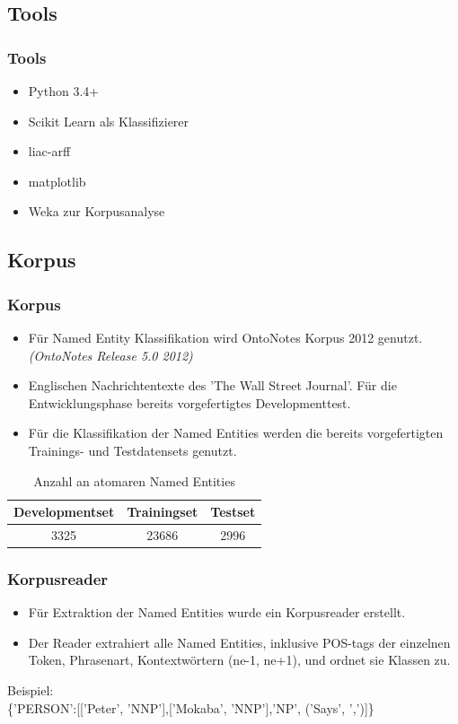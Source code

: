 \documentclass{beamer}
\begin{document}
	\subsection{Tools}
	\begin{frame}
			\frametitle{Tools}
			\begin{itemize}
				\item Python 3.4+
				\item Scikit Learn als Klassifizierer
				\item liac-arff
				\item matplotlib
				\item Weka zur Korpusanalyse
			\end{itemize}
	\end{frame}
	\subsection{Korpus}
	\begin{frame}
			\frametitle{Korpus}
			\begin{itemize}
				\item Für Named Entity Klassifikation wird OntoNotes Korpus 2012 genutzt. \textit{(OntoNotes Release 5.0 2012)}
				\item Englischen Nachrichtentexte des 'The Wall Street Journal'.
				Für die Entwicklungsphase bereits vorgefertigtes Developmenttest.
				\item Für die Klassifikation der Named Entities werden die bereits vorgefertigten Trainings- und Testdatensets genutzt.
			\end{itemize}
			 \begin{table}
			 	\caption{Anzahl an atomaren Named Entities}
			 	\begin{tabular}{ccc}
			 		\toprule
					Developmentset & Trainingset & Testset\\
			 		\midrule
					3325 & 23686 & 2996\\
			 		\bottomrule
			 	\end{tabular}
			 	\label{tab:datasets}
			 \end{table}
	\end{frame}
		\begin{frame}
			\frametitle{Korpusreader}
			\begin{itemize}
				\item Für Extraktion der Named Entities wurde ein Korpusreader erstellt.
				\item 	Der Reader extrahiert alle Named Entities, inklusive POS-tags der einzelnen Token, Phrasenart, Kontextwörtern (ne-1, ne+1), und ordnet sie Klassen zu.
			\end{itemize}
			
			
		
			
			Beispiel:\\
			\{'PERSON':[['Peter', 'NNP'],['Mokaba', 'NNP'],'NP', ('Says', ',')]\}
		\end{frame}
	
\end{document}
